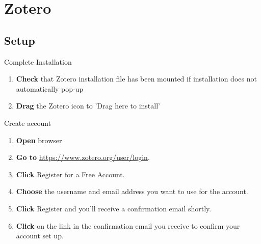 \documentclass[10pt,a4paper]{article}
\begin{document}


\section{Zotero}
\subsection{Setup}
\begin{textbox}{Complete Installation}
 

  

\begin{enumerate}
\item \textbf{Check} that Zotero installation file has been mounted if installation does not automatically pop-up
\item \textbf{Drag} the Zotero icon to 'Drag here to install'
\end{enumerate}

\end{textbox}

\begin{textbox}{Create account}
 

  

\begin{enumerate}
\item \textbf{Open} browser
\item \textbf{Go to}  \href{https://www.zotero.org/user/login}{https://www.zotero.org/user/login}. 
\item \textbf{Click} Register for a Free Account.
\item \textbf{Choose} the username and email address you want to use for the account. 
\item \textbf{Click} Register and you’ll receive a confirmation email shortly. 
\item \textbf{Click} on the link in the confirmation email you receive to confirm your account set up.
\end{enumerate}

\end{textbox}
\end{document}

